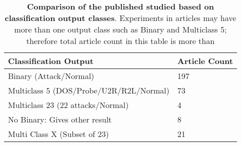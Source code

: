 
\begin{table}[!ht]
    \centering 
    \caption{ \textbf{Comparison of the published studied based on classification output classes}. Experiments in articles may have more than one output class such as Binary and Multiclass 5; therefore total article count in this table is more than \totalNumberOfArticles}
    \label{table-metaClassificationOutputClasses}

\begin{tabular}{@{}p{}p{}@{}}

\toprule

Classification Output                  & Article Count      \\

\midrule

Binary (Attack/Normal)                  & 197        \\
Multiclass 5 (DOS/Probe/U2R/R2L/Normal) & 73  \\
Multiclass 23 (22 attacks/Normal)       & 4 \\
No Binary: Gives other result           & 8       \\
Multi Class X (Subset of 23)            & 21     \\

\bottomrule

\end{tabular}


\end{table}
